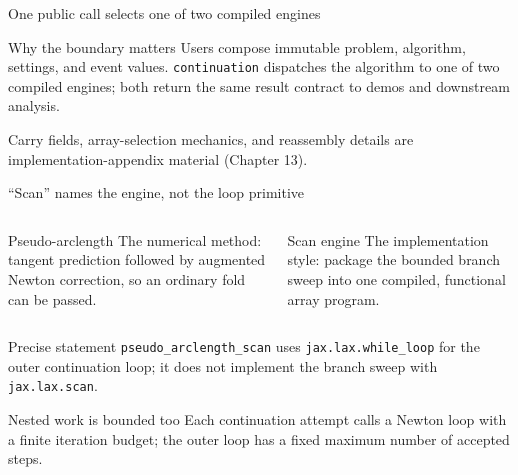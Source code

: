 \begin{frame}{One public call selects one of two compiled engines}
\centering
{}
\vspace{4mm}
\begin{block}{Why the boundary matters}
Users compose immutable problem, algorithm, settings, and event values.
\texttt{continuation} dispatches the algorithm to one of two compiled engines;
both return the same result contract to demos and downstream analysis.
\end{block}
\vfill
{\scriptsize Carry fields, array-selection mechanics, and reassembly details are implementation-appendix material (Chapter 13).}
\end{frame}

\begin{frame}{``Scan'' names the engine, not the loop primitive}
\begin{columns}[T]
\begin{block}{Pseudo-arclength}
The numerical method: tangent prediction followed by augmented Newton
correction, so an ordinary fold can be passed.
\end{block}
\begin{block}{Scan engine}
The implementation style: package the bounded branch sweep into one compiled,
functional array program.
\end{block}
\end{columns}
\vspace{5mm}
\begin{alertblock}{Precise statement}
\texttt{pseudo\_arclength\_scan} uses \texttt{jax.lax.while\_loop} for the
outer continuation loop; it does not implement the branch sweep with
\texttt{jax.lax.scan}.
\end{alertblock}
\begin{block}{Nested work is bounded too}
Each continuation attempt calls a Newton loop with a finite iteration budget;
the outer loop has a fixed maximum number of accepted steps.
\end{block}
\end{frame}

